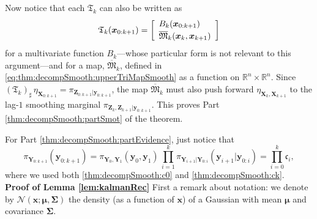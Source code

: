 \documentclass[twoside,11pt]{article}
\newcommand{\Gauss}{\mathcal{N}}                                      %
\newcommand{\push}{_\sharp}                                      %
\newcommand{\re}{\mathbb{R}}
\newcommand{\Xb}{\boldsymbol{X}}
\newcommand{\xb}{\boldsymbol{x}}
\newcommand{\Yb}{\boldsymbol{Y}}
\newcommand{\yb}{\boldsymbol{y}}
\newcommand{\Zb}{\boldsymbol{Z}}
\newcommand{\Sigmab}{\boldsymbol{\Sigma}}
\newcommand{\mub}{\boldsymbol{\mu}}
\newcommand{\submap}{\mathfrak{M}}
\begin{document}
Now notice that each $\mathfrak{T}_{k}$ can also be written as
\begin{equation}  
\mathfrak{T}_{k}( \xb_{0:k+1} ) = 
  \left[\begin{array}{l}
    B_k(\xb_{0:k+1})\\[\spacinglines] 
    \overline{\submap}_k(\xb_k ,\xb_{k+1})\\
     \end{array}\right]
\end{equation}  
for a multivariate function $B_k$---whose particular form is not relevant to this argument---and for a map, $\overline{\submap}_k$, %
defined in \eqref{eq:thm:decompSmooth:upperTriMapSmooth} as a function
on $\re^n \times \re^n$. 
%
Since $(\mathfrak{T}_{k})\push\,\eta_{\Xb_{0:k+1}} = 
\pi_{\Zb_{0:k+1}\vert \yb_{0:k+1}}$, the map  
$\overline{\submap}_k$ must also push forward
$\eta_{\Xb_{k},\Xb_{k+1}}$ to the
lag-$1$ smoothing marginal $\pi_{\Zb_k,\Zb_{k+1}\vert \yb_{0:k+1}}$.
This proves Part \ref{thm:decompSmooth:partSmot} of the theorem.

For Part \ref{thm:decompSmooth:partEvidence}, just notice that
\begin{equation} \label{thm:decompSmooth:data}
  \pi_{\Yb_{0:k+1}}(\yb_{0:k+1}) = 
  \pi_{\Yb_0,\Yb_1}(\yb_0,\yb_1)\,
  \prod_{i=1}^k \pi_{\Yb_{i+1}\vert \Yb_{0:i}}(\yb_{i+1}\vert \yb_{0:i})  =
  \prod_{i=0}^k \mathfrak{c}_i,
\end{equation}
where we used both \eqref{thm:decompSmooth:c0} and \eqref{thm:decompSmooth:ck}.
\hfill\BlackBox\\[2mm]

\noindent
{\bf Proof of Lemma \ref{lem:kalmanRec}} 
First a remark about notation:
we denote by $\Gauss( \xb ; \mub, \Sigmab )$ the
density (as a function of $\xb$) of a Gaussian  with mean $\mub$ and covariance $\Sigmab$.
%
\end{document}

